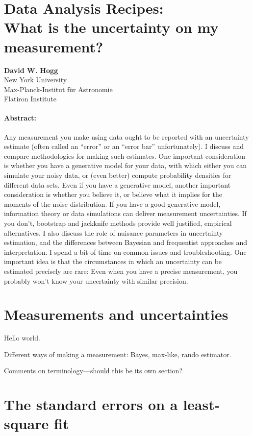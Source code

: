 \documentclass[12pt, letterpaper]{article}
\begin{document}
\section*{Data Analysis Recipes:\\
  What is the uncertainty on my measurement?}

\textbf{David W. Hogg} \\
{\footnotesize New York University} \\
{\footnotesize Max-Planck-Institut f\"ur Astronomie} \\
{\footnotesize Flatiron Institute}

\paragraph{Abstract:}
Any measurement you make using data ought to be reported with an uncertainty
estimate (often called an ``error'' or an ``error bar'' unfortunately).
I discuss and compare methodologies for making such estimates.
One important consideration is whether you have a generative model for your
data, with which either you can simulate your noisy data, or (even better)
compute probability densities for different data sets.
Even if you have a generative model, another important consideration is whether
you believe it, or believe what it implies for the moments of
the noise distribution.
If you have a good generative model, information theory or data simulations can deliver
measurement uncertainties.
If you don't, bootstrap and jackknife methods provide well justified, empirical
alternatives.
I also discuss the role of nuisance parameters in uncertainty estimation, and
the differences between Bayesian and frequentist approaches and interpretation.
I spend a bit of time on common issues and troubleshooting.
One important idea is that the circumstances in which an uncertainty can be estimated
precisely are rare: Even when you have a precise measurement, you probably won't know
your uncertainty with similar precision.

\section{Measurements and uncertainties}

Hello world.

Different ways of making a measurement: Bayes, max-like, rando estimator.

Comments on terminology---should this be its own section?

\section{The standard errors on a least-square fit}
\end{document}
